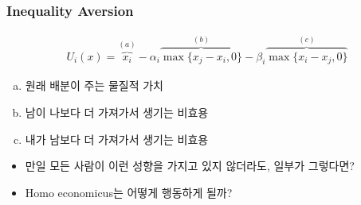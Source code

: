 \documentclass[final]{beamer}
\begin{document}
\begin{frame}\frametitle{Inequality Aversion}\vspace{-1em}
\begin{align*}
U_i(x)=\overbrace{x_i}^{(a)} - \alpha_i \overbrace{\max\{x_j-x_i,0\}}^{(b)}-\beta_i \overbrace{\max\{x_i-x_j,0\}}^{(c)}
\end{align*}
%
\vspace{-1em}
\begin{enumerate}[(a)]
	\item 원래 배분이 주는 물질적 가치 
	\item 남이 나보다 더 가져가서 생기는 비효용 
	\item 내가 남보다 더 가져가서 생기는 비효용 
\end{enumerate}
\begin{itemize}
\item 만일 모든 사람이 이런 성향을 가지고 있지 않더라도, 일부가 그렇다면?
\item Homo economicus는 어떻게 행동하게 될까? 
\end{itemize}
\end{frame}
%
\end{document}
